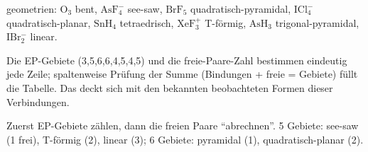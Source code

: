 \begin{ergebnis}
geometrien: $\mathrm{O_3}$ bent, $\mathrm{AsF_4^-}$ see-saw, $\mathrm{BrF_5}$
quadratisch-pyramidal, $\mathrm{ICl_4^-}$ quadratisch-planar, $\mathrm{SnH_4}$
tetraedrisch, $\mathrm{XeF_3^+}$ T-förmig, $\mathrm{AsH_3}$ trigonal-pyramidal,
$\mathrm{IBr_2^-}$ linear.
\end{ergebnis}

\begin{kontrolle}
Die EP-Gebiete (3,5,6,6,4,5,4,5) und die freie-Paare-Zahl bestimmen eindeutig
jede Zeile; spaltenweise Prüfung der Summe (Bindungen + freie = Gebiete) füllt
die Tabelle. Das deckt sich mit den bekannten beobachteten Formen dieser
Verbindungen.
\end{kontrolle}

\begin{merksatz}
Zuerst EP-Gebiete zählen, dann die freien Paare ``abrechnen''. 5 Gebiete:
see-saw (1 frei), T-förmig (2), linear (3); 6 Gebiete: pyramidal (1),
quadratisch-planar (2).
\end{merksatz}
